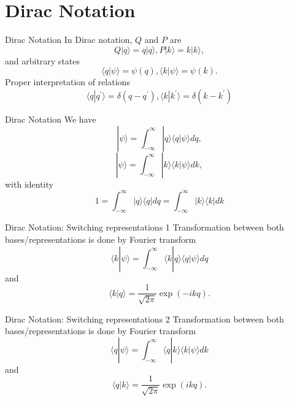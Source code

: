 \documentclass[12pt]{beamer}
\begin{document}
\section[Dirac Notation]{Dirac Notation}
\begin{frame}{Dirac Notation}
In Dirac notation, $Q$ and $P$ are
\begin{displaymath}
  Q|q\rangle=q|q\rangle,   P|k\rangle=k|k\rangle,
\end{displaymath}
and arbitrary states
\begin{displaymath}
  \langle q|\psi\rangle = \psi(q), \langle k|\psi\rangle = \psi(k).
\end{displaymath}
Proper interpretation of relations 
\begin{displaymath}
  \langle q|q^{\prime}\rangle=\delta(q-q^{\prime}),\langle k|k^{\prime}\rangle=\delta(k-k^{\prime})
\end{displaymath}
\end{frame}
\begin{frame}{Dirac Notation}
We have 
\begin{displaymath}
  |\psi\rangle=\int_{-\infty}^{\infty}|q\rangle\langle q|\psi \rangle dq,
\end{displaymath}
\begin{displaymath}
  |\psi\rangle=\int_{-\infty}^{\infty}|k\rangle\langle k|\psi \rangle dk,
\end{displaymath}
with identity
\begin{displaymath}
  1 = \int_{-\infty}^{\infty}|q\rangle\langle q| dq=\int_{-\infty}^{\infty}|k\rangle\langle k| dk
\end{displaymath}
\end{frame}
\begin{frame}{Dirac Notation: Switching representations 1}
Transformation between both bases/representations is done by Fourier transform 
\begin{displaymath}
  \langle k|\psi\rangle=\int_{-\infty}^{\infty}\langle k|q\rangle \langle q|\psi\rangle dq
\end{displaymath}
and
\begin{displaymath}
  \langle k|q\rangle = \frac{1}{\sqrt{2\pi}}\exp(-ikq).
\end{displaymath}
\end{frame}
\begin{frame}{Dirac Notation: Switching representations 2}
Transformation between both bases/representations is done by Fourier transform 
\begin{displaymath}
  \langle q|\psi\rangle=\int_{-\infty}^{\infty}\langle q|k\rangle \langle k|\psi\rangle dk
\end{displaymath}
and
\begin{displaymath}
  \langle q|k\rangle = \frac{1}{\sqrt{2\pi}}\exp(ikq).
\end{displaymath}
\end{frame}
\end{document}
